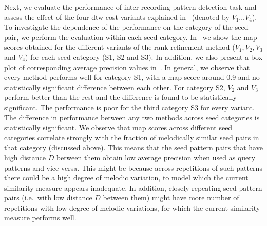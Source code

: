 Next, we evaluate the performance of inter-recording pattern detection task and assess the effect of the four \gls{dtw} cost variants explained in~ (denoted by $V_1 \dots V_4$). To investigate the dependence of the performance on the category of the seed pair, we perform the evaluation within each seed category. In~ we show the \gls{map} scores obtained for the different variants of the rank refinement method ($V_1, V_2, V_3$ and $V_4$) for each seed category (S1, S2 and S3). In addition, we also present a box plot of corresponding average precision values in~. In general, we observe that every method performs well for category S1, with a \gls{map} score around 0.9 and no statistically significant difference between each other. For category S2, $V_2$ and $V_3$ perform better than the rest and the difference is found to be statistically significant. The performance is poor for the third category S3 for every variant. The difference in performance between any two methods across seed categories is statistically significant. We observe that \gls{map} scores across different seed categories correlate strongly with the fraction of melodically similar seed pairs in that category (discussed above). This means that the seed pattern pairs that have high distance $D$ between them obtain low average precision when used as query patterns and vice-versa. This might be because across repetitions of such patterns there could be a high degree of melodic variation, to model which the current similarity measure appears inadequate. In addition, closely repeating seed pattern pairs (i.e.~with low distance $D$ between them) might have more number of repetitions with low degree of melodic variations, for which the current similarity measure performs well. 


